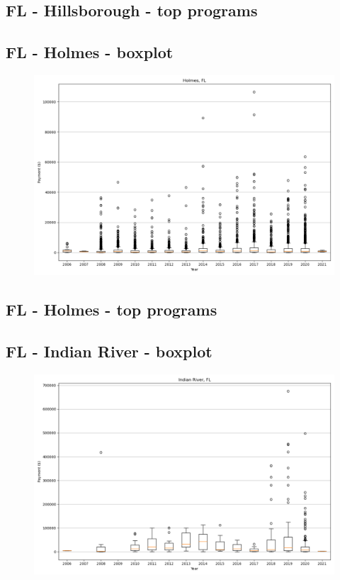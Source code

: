 \subsection*{FL - Hillsborough - top programs}

\newpage
\subsection*{FL - Holmes - boxplot}
\begin{figure}[h]
\centering
\includegraphics[width=7in]{../output/boxplots/counties/Holmes-FL_boxplot.png}
\end{figure}


\subsection*{FL - Holmes - top programs}

\newpage
\subsection*{FL - Indian River - boxplot}
\begin{figure}[h]
\centering
\includegraphics[width=7in]{../output/boxplots/counties/Indian River-FL_boxplot.png}
\end{figure}


